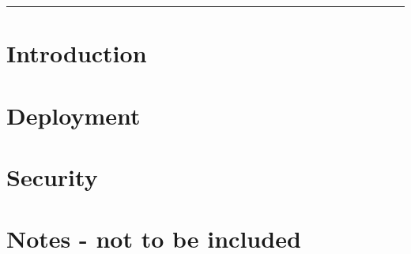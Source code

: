 \documentclass[a4paper]{article}
\begin{document}

\vspace{2cm}
\hrule


\newpage
\tableofcontents
\todototoc
\listoftodos
\newpage

\section{Introduction}%
\label{sec:introduction}



\section{Deployment}%
\label{sec:deployment}

\section{Security}%
\label{sec:security}




\newpage
\section*{Notes - not to be included}%
\label{sec:notes_not_to_be_included}



\end{document}
